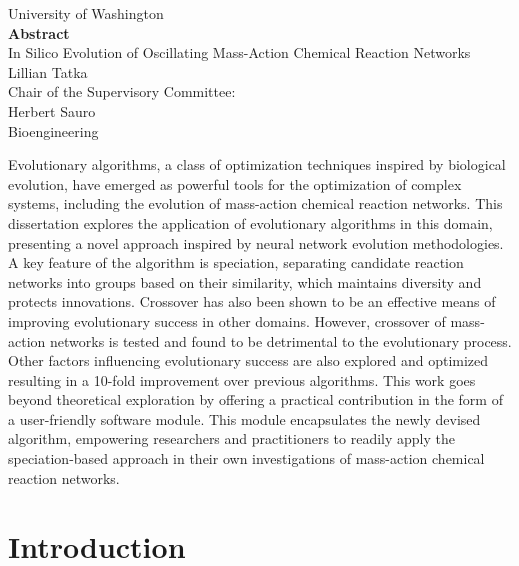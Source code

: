 \documentclass[12pt]{report}
\begin{document}
\begin{center}
University of Washington\\
\vspace*{\fill}
\textbf{Abstract} \\
\vspace*{\fill}
In Silico Evolution of Oscillating Mass-Action Chemical Reaction Networks\\
\vspace*{\fill}
Lillian Tatka\\
\vspace*{\fill}
Chair of the Supervisory Committee:\\
Herbert Sauro\\
Bioengineering
\end{center}
\vspace*{\fill}
Evolutionary algorithms, a class of optimization techniques inspired by biological evolution, have emerged as powerful tools for the optimization of complex systems, including the evolution of mass-action chemical reaction networks. This dissertation explores the application of evolutionary algorithms in this domain, presenting a novel approach inspired by neural network evolution methodologies. A key feature of the algorithm is speciation, separating candidate reaction networks into groups based on their similarity, which maintains diversity and protects innovations. Crossover has also been shown to be an effective means of improving evolutionary success in other domains. However, crossover of mass-action networks is tested and found to be detrimental to the evolutionary process. Other factors influencing evolutionary success are also explored and optimized resulting in a 10-fold improvement over previous algorithms. This work goes beyond theoretical exploration by offering a practical contribution in the form of a user-friendly software module. This module encapsulates the newly devised algorithm, empowering researchers and practitioners to readily apply the speciation-based approach in their own investigations of mass-action chemical reaction networks.


\tableofcontents

\listoffigures

\listoftables

\chapter{Introduction}
\end{document}

